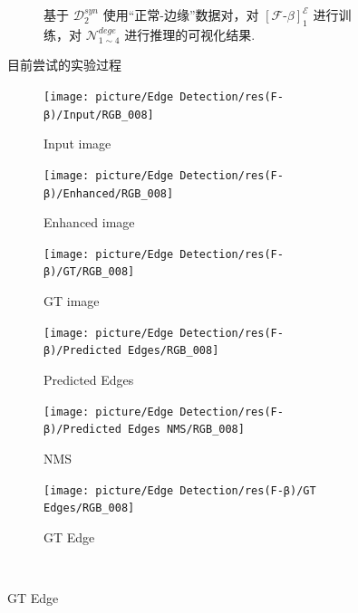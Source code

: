 \documentclass[a4paper]{ctexart}
\begin{document}
\begin{figure}[htbp]
\begin{subfigure}{0.45\textwidth}
				\captionsetup{font=scriptsize}
				\caption{基于 $\mathcal{D}^{syn}_{2}$ 使用“正常-边缘”数据对，对 ${\left[\mathcal{F}\text{-}\beta\right]}^{\mathcal{E}}_1$ 进行训练，对 $\mathcal{N}_{1 \sim 4}^{dege}$ 进行推理的可视化结果.}
				\label{fig: LLtoEdge(trainbasenormal)}
			\end{subfigure}
			\caption{目前尝试的实验过程}
		\end{figure}
		
		
		\begin{figure}[htbp]
			\centering
			\begin{subfigure}{0.16\textwidth}
				\caption*{Input image}
				\texttt{[image: picture/Edge Detection/res(F-β)/Input/RGB\_008]}
				\captionsetup{font=scriptsize}
				\label{fig: RGB_008}
			\end{subfigure}
			\begin{subfigure}{0.16\textwidth}
				\caption*{Enhanced image}
				\texttt{[image: picture/Edge Detection/res(F-β)/Enhanced/RGB\_008]}
				\captionsetup{font=scriptsize}
				\label{fig: RGB_008 Enhanced}
			\end{subfigure}
			\begin{subfigure}{0.16\textwidth}
				\caption*{GT image}
				\texttt{[image: picture/Edge Detection/res(F-β)/GT/RGB\_008]}
				\captionsetup{font=scriptsize}
				\label{fig: RGB_008 GT}
			\end{subfigure}
			\begin{subfigure}{0.16\textwidth}
				\caption*{Predicted Edges}
				\texttt{[image: picture/Edge Detection/res(F-β)/Predicted Edges/RGB\_008]}
				\captionsetup{font=scriptsize}
				\label{fig: RGB_008 Pred}
			\end{subfigure}
			\begin{subfigure}{0.16\textwidth}
				\caption*{NMS}
				\texttt{[image: picture/Edge Detection/res(F-β)/Predicted Edges NMS/RGB\_008]}
				\captionsetup{font=scriptsize}
				\label{fig: RGB_008 Pred NMS}
			\end{subfigure}
			\begin{subfigure}{0.16\textwidth}
				\caption*{GT Edge}
				\texttt{[image: picture/Edge Detection/res(F-β)/GT Edges/RGB\_008]}
				\captionsetup{font=scriptsize}
				\label{fig: RGB_008 GT Edges}
			\end{subfigure} \\
			
			\vspace{-10pt}
			

\end{figure}
\end{document}
